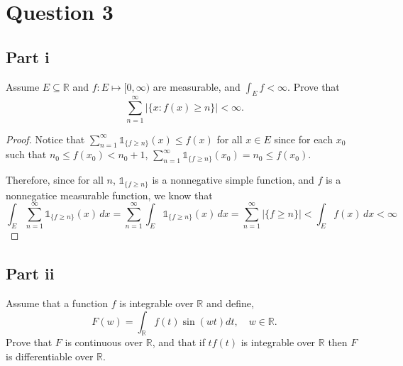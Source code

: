 \section{Question 3}

\subsection{Part i}

\begin{question}
    Assume $E \subseteq \mathbb{R}$ and $f: E \mapsto[0, \infty)$ are measurable, and $\int_E f<\infty$. Prove that
    $$
    \sum_{n=1}^{\infty}|\{x: f(x) \geq n\}|<\infty .
    $$
\end{question}

\begin{answer}
    \begin{proof}
        Notice that $\sum_{n=1}^{\infty} \mathbb{1}_{\{f \geq n\}}(x) \leq f(x)$ for all $x\in E$ since for each $x_0$ such that $n_0 \leq f(x_0) < n_0+1$, $\sum_{n=1}^{\infty} \mathbb{1}_{\{f \geq n\}}(x_0) = n_0 \leq f(x_0)$.
        
        Therefore, since for all $n$, $\mathbb{1}_{\{f \geq n\}}$ is a nonnegative simple function, and $f$ is a nonnegatice measurable function, we know that
        \begin{equation}
            \int_{E} \sum_{n=1}^{\infty} \mathbb{1}_{\{f \geq n\}}(x) \,dx = \sum_{n=1}^{\infty} \int_E\mathbb{1}_{\{f \geq n\}}(x) \,dx = \sum_{n=1}^{\infty} \lvert {\{f \geq n\}} \rvert < \int_E f(x) \,dx < \infty
        \end{equation}
    \end{proof}
\end{answer}

\subsection{Part ii}

\begin{question}
    Assume that a function $f$ is integrable over $\mathbb{R}$ and define,
    $$
    F(w)=\int_{\mathbb{R}} f(t) \sin (w t) d t, \quad w \in \mathbb{R} .
    $$
    Prove that $F$ is continuous over $\mathbb{R}$, and that if $t f(t)$ is integrable over $\mathbb{R}$ then $F$ is differentiable over $\mathbb{R}$.
\end{question}

